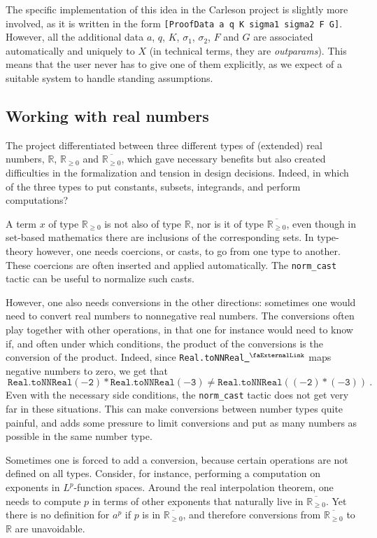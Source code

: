 \documentclass[12pt]{amsart}
\newcommand{\lean}[1]{\lstinline{#1}}
\newcommand{\mlean}[1]{\mathtt{\ #1\ }}
\newcommand*{\real}{\mathbb{R}} %
\newcommand{\nnreal}{\real_{\ge0}}
\newcommand{\ennreal}{\overline{\real_{\ge0}}}
\newcommand{\extlink}{~\ensuremath{{}^\text{\faExternalLink}}}
\theoremstyle{definition}
\theoremstyle{plain}
\begin{document}
The specific implementation of this idea in the Carleson project is slightly
more involved, as it is written in the form \lean{[ProofData a q K sigma1
sigma2 F G]}. However, all the additional data $a$, $q$, $K$, $\sigma_1$,
$\sigma_2$, $F$ and $G$ are associated automatically and uniquely to $X$ (in
technical terms, they are \emph{outparams}). This means that the user never
has to give one of them explicitly, as we expect of a suitable system to
handle standing assumptions.


\subsection{Working with real numbers}\label{subsec:real}

The project differentiated between three different types of (extended) real numbers, $\real$, $\nnreal$ and $\ennreal$,
which gave necessary benefits but also created difficulties in the formalization
and tension in design decisions.
Indeed, in which of the three types to put constants,
subsets, integrands, and perform computations?

A term $x$ of type $\nnreal$ is not also of type $\real$, nor is it of type $\ennreal$, even though in set-based mathematics there are inclusions of the corresponding sets. In type-theory however, one needs coercions, or casts, to go from one type to another. These coercions are often inserted and applied automatically.
The \texttt{norm\_cast} tactic can be useful to normalize such casts.

However, one also needs conversions in the other directions: sometimes one would need to convert real numbers to nonnegative real numbers. The conversions often play together with other operations, in that one for instance would need to know if, and often under which conditions, the product of the conversions is the conversion of the product. Indeed, since \texttt{Real.toNNReal}\href{https://github.com/leanprover-community/mathlib4/blob/44ea3a0e13339f31231dde209c4f8196e179065d/Mathlib/Data/NNReal/Defs.lean#L154-L156}{\extlink} maps negative numbers to zero, we get that
\[ \mlean{Real.toNNReal (-2) * Real.toNNReal (-3) \ne Real.toNNReal ((-2) * (-3))}. \]
Even with the necessary side conditions, the \texttt{norm\_cast} tactic does not get very far
in these situations.
This can make conversions between number types quite painful,
and adds some pressure to limit conversions and put as many numbers as possible in the same number type.

Sometimes one is forced to add a conversion, because certain operations are not defined on all types.
Consider, for instance, performing a computation on exponents in $L^p$-function spaces.
Around the real interpolation theorem, one needs to compute $p$ in terms of other exponents that
naturally live in $\ennreal$.
Yet there is no definition for $a^p$ if $p$ is in $\ennreal$, and therefore conversions from
$\ennreal$ to $\real$ are unavoidable.
\end{document}
